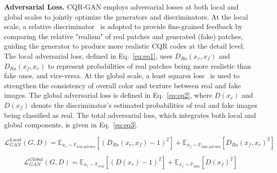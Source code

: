 \documentclass[preprint,12pt]{elsarticle}
\begin{document}

\textbf{Adversarial Loss.} CQR-GAN employs adversarial losses at both local and global scales to jointly optimize the generators and discriminators. 
At the local scale, a relative discriminator~\cite{jolicoeur2018} is adopted to provide fine-grained feedback by comparing the relative "realism" of real patches and generated (fake) patches, guiding the generator to produce more realistic CQR codes at the detail level. The local adversarial loss, defined in Eq.~\ref{eq:eq1}, uses $D_{Ra}(x_{r},x_{f})$ and $D_{Ra}(x_{f},x_{r})$ to represent probabilities of real patches being more realistic than fake ones, and vice-versa. 
At the global scale, a least squares loss~\cite{Mao2017ICCV} is used to strengthen the consistency of overall color and texture between real and fake images. The global adversarial loss is defined in Eq.~\ref{eq:eq2}, where $D(x_r)$ and $D(x_f)$ denote the discriminator's estimated probabilities of real and fake images being classified as real. 
The total adversarial loss, which integrates both local and global components, is given in  Eq.~\ref{eq:eq3}.

\begin{equation}
    \mathcal{L}_{GAN}^{Local}(G, D) = \mathbb{E}_{x_r \sim \mathbb{P}_{\text{real-patches}}} [(D_{Ra} (x_r,x_f)-1)^2] + \mathbb{E}_{x_f \sim \mathbb{P}_{\text{fake-patches}}} [D_{Ra} (x_f,x_r)^2]
    \label{eq:eq1}
\end{equation}

\begin{equation}
    \mathcal{L}_{GAN}^{Global}(G, D) = \mathbb{E}_{x_r \sim \mathbb{P}_{\text{real}}} \left[ (D(x_r) - 1)^2 \right] + \mathbb{E}_{x_f \sim \mathbb{P}_{\text{fake}}} \left[ D(x_f)^2 \right]
    \label{eq:eq2}
\end{equation}
\end{document}
